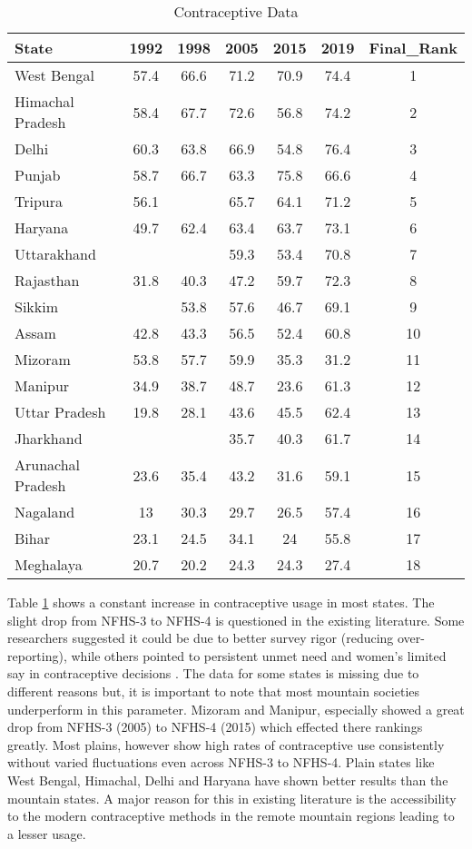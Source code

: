 \begin{table}[h!]
\centering
\caption{Contraceptive Data}
\begin{tabular}{lcccccc}
\toprule
State & 1992 & 1998 & 2005 & 2015 & 2019 & Final\_Rank \\
\midrule
West Bengal & 57.4 & 66.6 & 71.2 & 70.9 & 74.4 & 1 \\
Himachal Pradesh & 58.4 & 67.7 & 72.6 & 56.8 & 74.2 & 2 \\
Delhi & 60.3 & 63.8 & 66.9 & 54.8 & 76.4 & 3 \\
Punjab & 58.7 & 66.7 & 63.3 & 75.8 & 66.6 & 4 \\
Tripura & 56.1 &  & 65.7 & 64.1 & 71.2 & 5 \\
Haryana & 49.7 & 62.4 & 63.4 & 63.7 & 73.1 & 6 \\
Uttarakhand &  &  & 59.3 & 53.4 & 70.8 & 7 \\
Rajasthan & 31.8 & 40.3 & 47.2 & 59.7 & 72.3 & 8 \\
Sikkim &  & 53.8 & 57.6 & 46.7 & 69.1 & 9 \\
Assam & 42.8 & 43.3 & 56.5 & 52.4 & 60.8 & 10 \\
Mizoram & 53.8 & 57.7 & 59.9 & 35.3 & 31.2 & 11 \\
Manipur & 34.9 & 38.7 & 48.7 & 23.6 & 61.3 & 12 \\
Uttar Pradesh & 19.8 & 28.1 & 43.6 & 45.5 & 62.4 & 13 \\
Jharkhand &  &  & 35.7 & 40.3 & 61.7 & 14 \\
Arunachal Pradesh & 23.6 & 35.4 & 43.2 & 31.6 & 59.1 & 15 \\
Nagaland & 13 & 30.3 & 29.7 & 26.5 & 57.4 & 16 \\
Bihar & 23.1 & 24.5 & 34.1 & 24 & 55.8 & 17 \\
Meghalaya & 20.7 & 20.2 & 24.3 & 24.3 & 27.4 & 18 \\
\bottomrule
\end{tabular}
\label{tab:contraceptive_data}
\end{table}
Table \ref{tab:contraceptive_data} shows a constant increase in contraceptive usage in most states. The slight drop from NFHS-3 to NFHS-4 is questioned in the existing literature. Some researchers suggested it could be due to better survey rigor (reducing over-reporting), while others pointed to persistent unmet need and women’s limited say in contraceptive decisions \citep{kumar2022measuring}. The data for some states is missing due to different reasons but, it is important to note that most mountain societies underperform in this parameter. Mizoram and Manipur, especially showed a great drop from NFHS-3 (2005) to NFHS-4 (2015) which effected there rankings greatly. Most plains, however show high rates of contraceptive use consistently without varied fluctuations even across NFHS-3 to NFHS-4. Plain states like West Bengal, Himachal, Delhi and Haryana have shown better results than the mountain states. A major reason for this in existing literature is  the accessibility to the modern contraceptive methods in the remote mountain regions leading to a lesser usage. 

